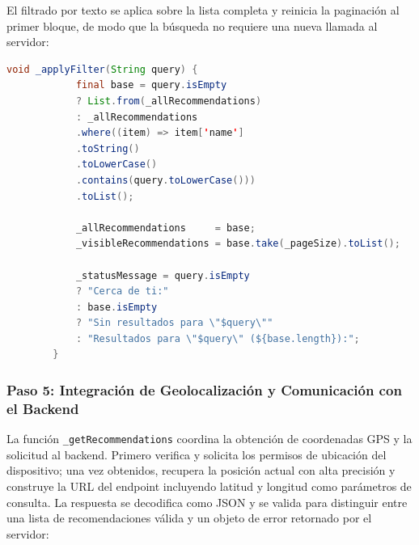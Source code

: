 \documentclass[11pt, letterpaper]{article}
\begin{document}
	El filtrado por texto se aplica sobre la lista completa y reinicia la
	paginación al primer bloque, de modo que la búsqueda no requiere una nueva
	llamada al servidor:
	
	\begin{lstlisting}[language=Java, caption=Filtrado en tiempo real con reinicio de paginación]
		void _applyFilter(String query) {
			final base = query.isEmpty
			? List.from(_allRecommendations)
			: _allRecommendations
			.where((item) => item['name']
			.toString()
			.toLowerCase()
			.contains(query.toLowerCase()))
			.toList();
			
			_allRecommendations     = base;
			_visibleRecommendations = base.take(_pageSize).toList();
			
			_statusMessage = query.isEmpty
			? "Cerca de ti:"
			: base.isEmpty
			? "Sin resultados para \"$query\""
			: "Resultados para \"$query\" (${base.length}):";
		}
	\end{lstlisting}
	
	\subsubsection{Paso 5: Integración de Geolocalización y Comunicación con el Backend}
	
	La función \texttt{\_getRecommendations} coordina la obtención de
	coordenadas GPS y la solicitud al backend. Primero verifica y solicita los
	permisos de ubicación del dispositivo; una vez obtenidos, recupera la
	posición actual con alta precisión y construye la URL del endpoint
	incluyendo latitud y longitud como parámetros de consulta. La respuesta
	se decodifica como JSON y se valida para distinguir entre una lista de
	recomendaciones válida y un objeto de error retornado por el servidor:
	
\end{document}
